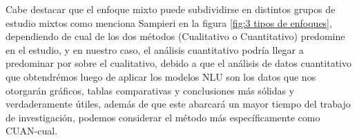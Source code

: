 Cabe destacar que el enfoque mixto puede subdividirse en distintos grupos de estudio mixtos como menciona Sampieri \cite{sampieri2014metodología} en la figura \ref{fig:3 tipos de enfoques}, dependiendo de cual de los dos métodos (Cualitativo o Cuantitativo) predomine en el estudio, y en nuestro caso, el análisis cuantitativo podría llegar a predominar por sobre el cualitativo, debido a que el análisis de datos cuantitativo que obtendrémos luego de aplicar los modelos NLU son los datos que nos otorgarán gráficos, tablas comparativas y conclusiones más sólidas y verdaderamente útiles, además de que este abarcará un mayor tiempo del trabajo de investigación, podemos considerar el método más específicamente como CUAN-cual.
